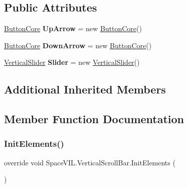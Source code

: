 \subsection*{Public Attributes}
\begin{DoxyCompactItemize}
\item 
\mbox{\label{class_space_v_i_l_1_1_vertical_scroll_bar_a83fe7120eb5047a19e4e422e072ff65f}} 
\mbox{\hyperlink{class_space_v_i_l_1_1_button_core}{Button\+Core}} {\bfseries Up\+Arrow} = new \mbox{\hyperlink{class_space_v_i_l_1_1_button_core}{Button\+Core}}()
\item 
\mbox{\label{class_space_v_i_l_1_1_vertical_scroll_bar_a55ebd1c124eb7ba6c742d08cdd2da0c8}} 
\mbox{\hyperlink{class_space_v_i_l_1_1_button_core}{Button\+Core}} {\bfseries Down\+Arrow} = new \mbox{\hyperlink{class_space_v_i_l_1_1_button_core}{Button\+Core}}()
\item 
\mbox{\label{class_space_v_i_l_1_1_vertical_scroll_bar_a1f3346f0d85f08b75d6a05dba3e58e7b}} 
\mbox{\hyperlink{class_space_v_i_l_1_1_vertical_slider}{Vertical\+Slider}} {\bfseries Slider} = new \mbox{\hyperlink{class_space_v_i_l_1_1_vertical_slider}{Vertical\+Slider}}()
\end{DoxyCompactItemize}
\subsection*{Additional Inherited Members}


\subsection{Member Function Documentation}
\mbox{\label{class_space_v_i_l_1_1_vertical_scroll_bar_aa74f074945d0b53b3a2dc0eb97904ce1}} 
\subsubsection{\texorpdfstring{Init\+Elements()}{InitElements()}}
{\footnotesize\ttfamily override void Space\+V\+I\+L.\+Vertical\+Scroll\+Bar.\+Init\+Elements (\begin{DoxyParamCaption}{ }\end{DoxyParamCaption})\hspace{0.3cm}{\ttfamily [virtual]}}



